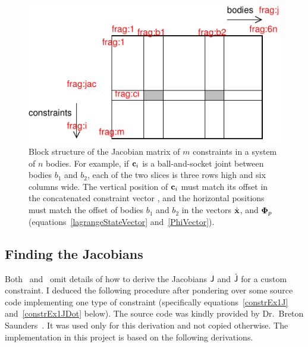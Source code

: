 \begin{figure}
\centerline{\includegraphics{figures/jacobian}}
\caption[]{Block structure of the Jacobian matrix of $m$ constraints in a system of $n$ bodies.
    For example, if $\ve{c}_i$ is a ball-and-socket joint between bodies $b_1$ and $b_2$, each of
    the two slices is three rows high and six columns wide. The vertical position of $\ve{c}_i$
    must match its offset in the concatenated constraint vector \hbox{}, and the horizontal
    positions must match the offset of bodies $b_1$ and $b_2$ in the vectors $\dot{\ve{x}}$,
    \ve{\Phi} and $\ve{\Phi}_p$ (equations~\ref{lagrangeStateVector} and~\ref{PhiVector}).
    \label{jacobianFigure}}
\end{figure}


\subsection{Finding the Jacobians\label{jacCalculation}}

Both~\cite{BaraffWitkin:97} and~\cite{Saunders:PhD} omit details of how to derive the Jacobians
$\mathsf{J}$ and $\dot{\mathsf{J}}$ for a custom constraint. I deduced the following procedure
after pondering over some source code implementing one type of constraint
(specifically equations~\ref{constrEx1J} and~\ref{constrEx1JDot} below). The source code
was kindly provided by Dr.~Breton Saunders~\cite{Saunders}. It was used only for this
derivation and not copied otherwise. The implementation in this project is based on the
following derivations.

